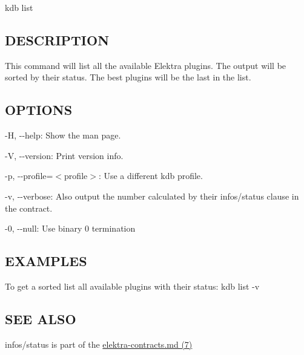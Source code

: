 {\ttfamily kdb list}

\subsection*{D\+E\+S\+C\+R\+I\+P\+T\+I\+O\+N}

This command will list all the available Elektra plugins. The output will be sorted by their status. The best plugins will be the last in the list.

\subsection*{O\+P\+T\+I\+O\+N\+S}


\begin{DoxyItemize}
\item {\ttfamily -\/\+H}, {\ttfamily -\/-\/help}\+: Show the man page.
\item {\ttfamily -\/\+V}, {\ttfamily -\/-\/version}\+: Print version info.
\item {\ttfamily -\/p}, {\ttfamily -\/-\/profile}=$<$profile$>$\+: Use a different kdb profile.
\item {\ttfamily -\/v}, {\ttfamily -\/-\/verbose}\+: Also output the number calculated by their {\ttfamily infos/status} clause in the contract.
\item {\ttfamily -\/0}, {\ttfamily -\/-\/null}\+: Use binary 0 termination
\end{DoxyItemize}

\subsection*{E\+X\+A\+M\+P\+L\+E\+S}

To get a sorted list all available plugins with their status\+: {\ttfamily kdb list -\/v}

\subsection*{S\+E\+E A\+L\+S\+O}


\begin{DoxyItemize}
\item {\ttfamily infos/status} is part of the \hyperlink{md_doc_help_elektra-contracts_doc_help_elektra-contracts_md}{elektra-\/contracts.md (7)} 
\end{DoxyItemize}